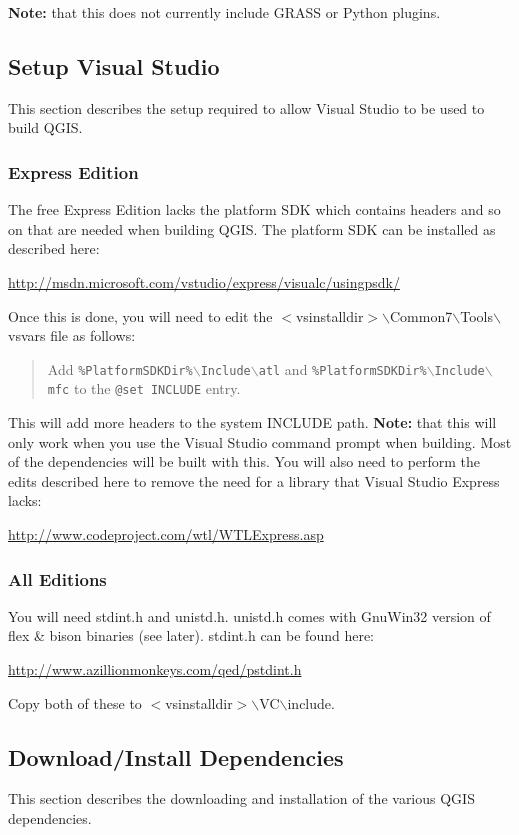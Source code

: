 \textbf{Note:} that this does not currently include GRASS or Python plugins.

\subsection{Setup Visual Studio}
This section describes the setup required to allow Visual Studio to be used to build QGIS. 

\subsubsection{Express Edition}
The free Express Edition lacks the platform SDK which contains headers and so on that are needed when building QGIS. The platform SDK can be installed as described here:


\url{http://msdn.microsoft.com/vstudio/express/visualc/usingpsdk/}

Once this is done, you will need to edit the $<$vsinstalldir$>$$\backslash$Common7$\backslash$Tools$\backslash$vsvars file as follows:

	\begin{quotation}
Add \texttt{\%PlatformSDKDir\%$\backslash$Include$\backslash$atl} and \texttt{\%PlatformSDKDir\%$\backslash$Include$\backslash$mfc} to the \texttt{@set INCLUDE} entry.
	\end{quotation}
This will add more headers to the system INCLUDE path. \textbf{Note:} that this will only work when you use the Visual Studio command prompt when building. Most of the dependencies will be built with this.
You will also need to perform the edits described here to remove the need for a library that Visual Studio Express lacks:

\url{http://www.codeproject.com/wtl/WTLExpress.asp}


\subsubsection{All Editions}
You will need stdint.h and unistd.h. unistd.h comes with GnuWin32 version of flex \& bison binaries (see later). stdint.h can be found here:

\url{http://www.azillionmonkeys.com/qed/pstdint.h}

Copy both of these to $<$vsinstalldir$>$$\backslash$VC$\backslash$include.

\subsection{Download/Install Dependencies}
This section describes the downloading and installation of the various QGIS dependencies.

